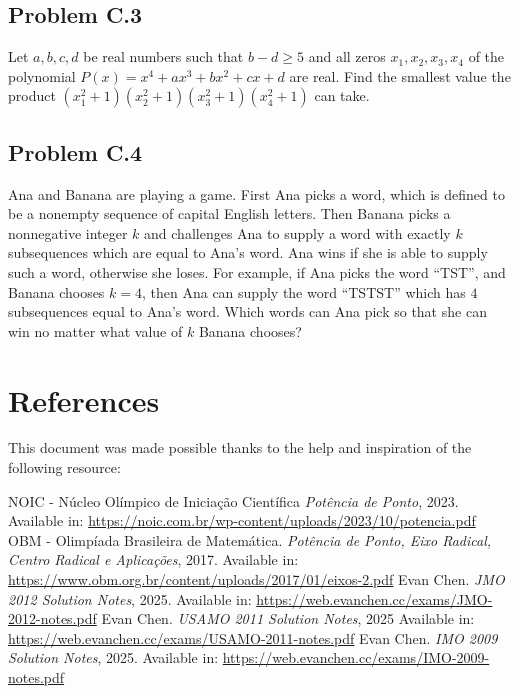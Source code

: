 \documentclass[12pt]{article}
\newcommand{\xmark}{\textcolor{color6}{\ding{55}}}   %
\begin{document}
    \clearpage

    \subsection{Problem C.3 \xmark}
      \begin{tcolorbox}[problembox]
         Let $a,b,c,d$ be real numbers such that $b-d\ge 5$ and all zeros $x_1,x_2,x_3,x_4$ of the polynomial $P(x)=x^4+ax^3+bx^2+cx+d$ are 
          real. Find the smallest value the product $(x_1^2+1)(x_2^2+1)(x_3^2+1)(x_4^2+1)$ can take.
      \end{tcolorbox}
          
    \clearpage

    \subsection{Problem C.4 \xmark}
      \begin{tcolorbox}[problembox]
         Ana and Banana are playing a game. First Ana picks a word, which is defined to be a nonempty sequence of capital English
          letters. Then Banana picks a nonnegative integer $k$ and challenges Ana to supply a word with exactly $k$ subsequences which are 
          equal to Ana's word. Ana wins if she is able to supply such a word, otherwise she loses. For example, if Ana picks the word “TST”,
          and Banana chooses $k=4$, then Ana can supply the word “TSTST” which has $4$ subsequences equal to Ana's word. Which words can Ana 
          pick so that she can win no matter what value of $k$ Banana chooses?
      \end{tcolorbox}

  \clearpage

  \section{\textsf{References}}
    This document was made possible thanks to the help and inspiration of the following resource:
    \renewcommand{\refname}{\vspace{-2em}}
    \begin{thebibliography}{9}
      NOIC - Núcleo Olímpico de Iniciação Científica
      \textit{Potência de Ponto}, 2023.
      Available in: \url{https://noic.com.br/wp-content/uploads/2023/10/potencia.pdf}
      OBM - Olimpíada Brasileira de Matemática.
      \textit{Potência de Ponto, Eixo Radical, Centro Radical e Aplicações}, 2017.
      Available in: \url{https://www.obm.org.br/content/uploads/2017/01/eixos-2.pdf}
      Evan Chen.
      \textit{JMO 2012 Solution Notes}, 2025.
      Available in: \url{https://web.evanchen.cc/exams/JMO-2012-notes.pdf}
      Evan Chen.
      \textit{USAMO 2011 Solution Notes}, 2025
      Available in: \url{https://web.evanchen.cc/exams/USAMO-2011-notes.pdf}
      Evan Chen.
      \textit{IMO 2009 Solution Notes}, 2025.
      Available in: \url{https://web.evanchen.cc/exams/IMO-2009-notes.pdf}
    \end{thebibliography}
\end{document}
